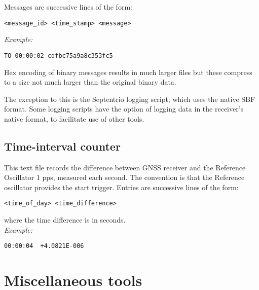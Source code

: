 Messages are successive lines of the form:
\begin{lstlisting}
<message_id> <time_stamp> <message>
\end{lstlisting}
\textit{Example:}
\begin{lstlisting}
TO 00:00:02 cdfbc75a9a8c353fc5
\end{lstlisting}

Hex encoding of binary messages results in much larger files but these compress to a size not much larger
than the original binary data.

The exception to this is the Septentrio logging script, which uses the native SBF format.
Some logging scripts have the option of logging data in the receiver's native format, to facilitate
use of other tools.

\subsection{Time-interval counter \label{s:TICformat}}

This text file records the difference between GNSS receiver and the Reference Oscillator 1 pps,
measured each second. The convention is that the Reference oscillator provides the start trigger.
Entries are successive lines of the form:
\begin{lstlisting}
<time_of_day> <time_difference>
\end{lstlisting}
where the time difference is in seconds.\\
\textit{Example:}
\begin{lstlisting}
00:00:04  +4.0821E-006 
\end{lstlisting}


































\section{Miscellaneous tools}














